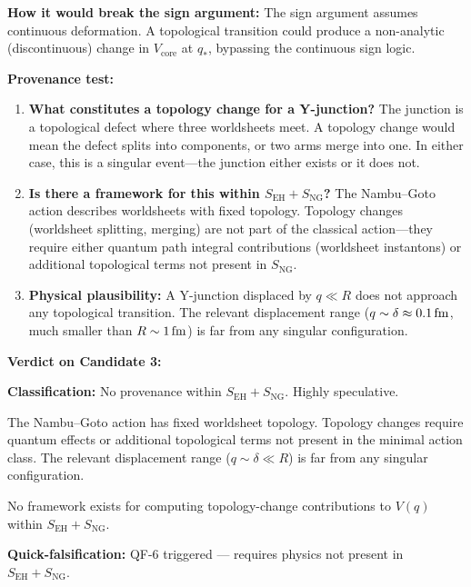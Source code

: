 \textbf{How it would break the sign argument:}
The sign argument assumes continuous deformation. A topological
transition could produce a non-analytic (discontinuous) change in
$V_{\mathrm{core}}$ at $q_*$, bypassing the continuous sign logic.

\textbf{Provenance test:}
\begin{enumerate}
    \item \textbf{What constitutes a topology change for a Y-junction?}
          The junction is a topological defect where three worldsheets
          meet. A topology change would mean the defect splits into
          components, or two arms merge into one. In either case, this
          is a singular event---the junction either exists or it does not.

    \item \textbf{Is there a framework for this within
          $S_{\mathrm{EH}} + S_{\mathrm{NG}}$?}
          The Nambu--Goto action describes worldsheets with fixed
          topology. Topology changes (worldsheet splitting, merging)
          are not part of the classical action---they require either
          quantum path integral contributions (worldsheet instantons)
          or additional topological terms not present in $S_{\mathrm{NG}}$.

    \item \textbf{Physical plausibility:} A Y-junction displaced by
          $q \ll R$ does not approach any topological transition. The
          relevant displacement range ($q \sim \delta \approx 0.1\,\mathrm{fm}$,
          much smaller than $R \sim 1\,\mathrm{fm}$) is far from any singular
          configuration.
\end{enumerate}

\textbf{Verdict on Candidate 3:}
\begin{resultbox}[title=Candidate 3: Core Topology Change]
\textbf{Classification:} No provenance within
$S_{\mathrm{EH}} + S_{\mathrm{NG}}$. Highly speculative.

The Nambu--Goto action has fixed worldsheet topology. Topology changes
require quantum effects or additional topological terms not present
in the minimal action class. The relevant displacement range
($q \sim \delta \ll R$) is far from any singular configuration.

No framework exists for computing topology-change contributions to
$V(q)$ within $S_{\mathrm{EH}} + S_{\mathrm{NG}}$.

\textbf{Quick-falsification:} QF-6 triggered --- requires physics not
present in $S_{\mathrm{EH}} + S_{\mathrm{NG}}$.
\tagDc
\end{resultbox}

